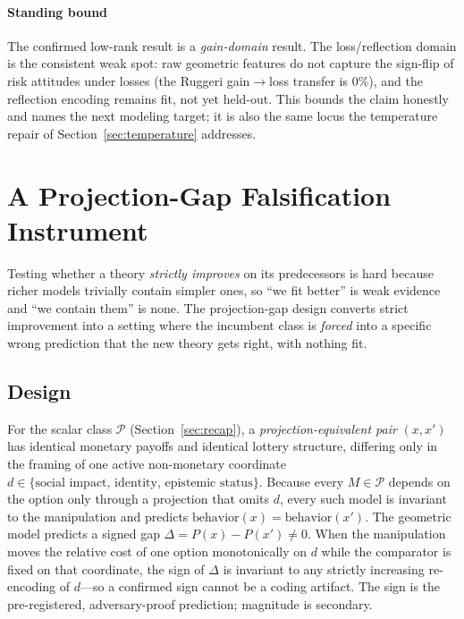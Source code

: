 \documentclass[journal]{IEEEtran}
\newcommand{\Pclass}{\mathcal{P}}          %
\begin{document}
\paragraph{Standing bound}
The confirmed low-rank result is a \emph{gain-domain} result.
The loss/reflection domain is the consistent weak spot: raw geometric features do not capture the sign-flip of risk attitudes under losses (the Ruggeri gain$\to$loss transfer is $0\%$), and the reflection encoding remains fit, not yet held-out.
This bounds the claim honestly and names the next modeling target; it is also the same locus the temperature repair of Section~\ref{sec:temperature} addresses.

\section{A Projection-Gap Falsification Instrument}
\label{sec:projgap}

Testing whether a theory \emph{strictly improves} on its predecessors is hard because richer models trivially contain simpler ones, so ``we fit better'' is weak evidence and ``we contain them'' is none.
The projection-gap design converts strict improvement into a setting where the incumbent class is \emph{forced} into a specific wrong prediction that the new theory gets right, with nothing fit.

\subsection{Design}
For the scalar class $\Pclass$ (Section~\ref{sec:recap}), a \emph{projection-equivalent pair} $(x,x')$ has identical monetary payoffs and identical lottery structure, differing only in the framing of one active non-monetary coordinate $d\in\{\text{social impact, identity, epistemic status}\}$.
Because every $M\in\Pclass$ depends on the option only through a projection that omits $d$, every such model is invariant to the manipulation and predicts $\text{behavior}(x)=\text{behavior}(x')$.
The geometric model predicts a signed gap $\Delta=P(x)-P(x')\neq0$.
When the manipulation moves the relative cost of one option monotonically on $d$ while the comparator is fixed on that coordinate, the sign of $\Delta$ is invariant to any strictly increasing re-encoding of $d$---so a confirmed sign cannot be a coding artifact.
The sign is the pre-registered, adversary-proof prediction; magnitude is secondary.
\end{document}
